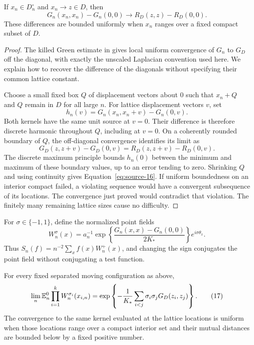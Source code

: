 \begin{lemma}
\label{correlations:green-diagonal}
If \(x_n\in D_n^\circ\) and \(x_n\to z\in D\), then
\begin{equation}
 G_n(x_n,x_n)-G_n(0,0)
       \longrightarrow R_D(z,z)-R_D(0,0).
 \tag{16}\label{eq:source-16}
\end{equation}
These differences are bounded uniformly when \(x_n\) ranges over
a fixed compact subset of \(D\).
\end{lemma}

\begin{proof}
The killed Green estimate in \cite[Lemma~4.2]{B} gives local uniform
convergence of \(G_n\) to \(G_D\) off the diagonal, with exactly the
unscaled Laplacian convention used here.  We explain how to recover
the difference of the diagonals without specifying their common
lattice constant.

Choose a small fixed box \(Q\) of displacement vectors about \(0\)
such that \(x_n+Q\) and \(Q\) remain in \(D\) for all large \(n\).
For lattice displacement vectors \(v\), set
\[
 h_n(v)=G_n(x_n,x_n+v)-G_n(0,v).
\]
Both kernels have the same unit source at \(v=0\).
Their difference is therefore discrete harmonic throughout \(Q\),
including at \(v=0\).  On a coherently rounded boundary of \(Q\),
the off-diagonal convergence identifies its limit as
\[
 G_D(z,z+v)-G_D(0,v)
       =R_D(z,z+v)-R_D(0,v).
\]
The discrete maximum principle bounds \(h_n(0)\) between the
minimum and maximum of these boundary values, up to an error
tending to zero.  Shrinking \(Q\) and using continuity gives
Equation~\eqref{eq:source-16}.
If uniform boundedness on an interior compact failed, a violating
sequence would have a convergent subsequence of its locations.
The convergence just proved would contradict that violation.
The finitely many remaining lattice sizes cause no difficulty.
\end{proof}

For \(\sigma\in\{-1,1\}\), define the normalized point fields
\[
 W_n^\sigma(x)
 =a_n^{-1}
   \exp\left\{\frac{G_n(x,x)-G_n(0,0)}{2K_*}\right\}
       e^{i\sigma\theta_x}.
\]
Thus \(S_n(f)=n^{-2}\sum_x f(x)W_n^+(x)\), and changing
the sign conjugates the point field without conjugating a test
function.

\begin{corollary}
\label{correlations:normalized}
For every fixed separated moving configuration as above,
\begin{equation}
 \lim_n\mathbb E_n^0\prod_{i=1}^kW_n^{\sigma_i}(x_{i,n})
 =\exp\left\{-\frac1{K_*}
          \sum_{i<j}\sigma_i\sigma_jG_D(z_i,z_j)\right\}.
 \tag{17}\label{eq:source-17}
\end{equation}
The convergence to the same kernel evaluated at the lattice
locations is uniform when those locations range over a compact
interior set and their mutual distances are bounded below by a
fixed positive number.
\end{corollary}

